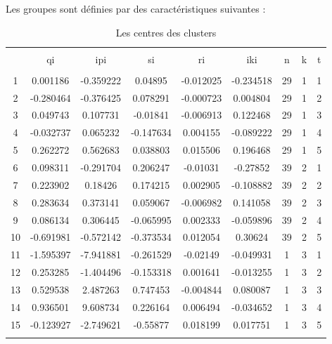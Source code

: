 \documentclass[11pt,]{article}
\begin{document}
Les groupes sont définies par des caractéristiques suivantes :

\FloatBarrier

\begin{table}[!htbp] \centering 
  \caption{Les centres des clusters} 
  \label{} 
\begin{tabular}{@{\extracolsep{5pt}} ccccccccc} 
\\[-1.8ex]\hline 
\hline \\[-1.8ex] 
 & qi & ipi & si & ri & iki & n & k & t \\ 
\hline \\[-1.8ex] 
1 & 0.001186 & -0.359222 & 0.04895 & -0.012025 & -0.234518 & 29 & 1 & 1 \\ 
2 & -0.280464 & -0.376425 & 0.078291 & -0.000723 & 0.004804 & 29 & 1 & 2 \\ 
3 & 0.049743 & 0.107731 & -0.01841 & -0.006913 & 0.122468 & 29 & 1 & 3 \\ 
4 & -0.032737 & 0.065232 & -0.147634 & 0.004155 & -0.089222 & 29 & 1 & 4 \\ 
5 & 0.262272 & 0.562683 & 0.038803 & 0.015506 & 0.196468 & 29 & 1 & 5 \\ 
6 & 0.098311 & -0.291704 & 0.206247 & -0.01031 & -0.27852 & 39 & 2 & 1 \\ 
7 & 0.223902 & 0.18426 & 0.174215 & 0.002905 & -0.108882 & 39 & 2 & 2 \\ 
8 & 0.283634 & 0.373141 & 0.059067 & -0.006982 & 0.141058 & 39 & 2 & 3 \\ 
9 & 0.086134 & 0.306445 & -0.065995 & 0.002333 & -0.059896 & 39 & 2 & 4 \\ 
10 & -0.691981 & -0.572142 & -0.373534 & 0.012054 & 0.30624 & 39 & 2 & 5 \\ 
11 & -1.595397 & -7.941881 & -0.261529 & -0.02149 & -0.049931 & 1 & 3 & 1 \\ 
12 & 0.253285 & -1.404496 & -0.153318 & 0.001641 & -0.013255 & 1 & 3 & 2 \\ 
13 & 0.529538 & 2.487263 & 0.747453 & -0.004844 & 0.080087 & 1 & 3 & 3 \\ 
14 & 0.936501 & 9.608734 & 0.226164 & 0.006494 & -0.034652 & 1 & 3 & 4 \\ 
15 & -0.123927 & -2.749621 & -0.55877 & 0.018199 & 0.017751 & 1 & 3 & 5 \\ 
\hline \\[-1.8ex] 
\end{tabular} 
\end{table}

\FloatBarrier
\end{document}
